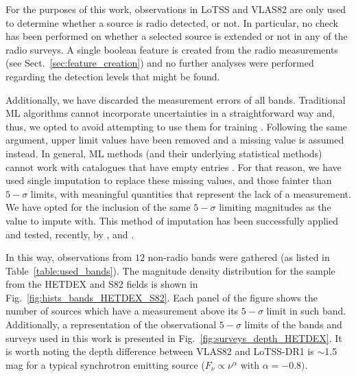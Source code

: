 \documentclass{aa}
\begin{document}
For the purposes of this work, observations in LoTSS and VLAS82 are only used to determine whether a source is radio detected, or not. In particular, no check has been performed on whether a selected source is extended or not in any of the radio surveys. A single boolean feature is created from the radio measurements (see Sect.~\ref{sec:feature_creation}) and no further analyses were performed regarding the detection levels that might be found.

Additionally, we have discarded the measurement errors of all bands. Traditional ML algorithms cannot incorporate uncertainties in a straightforward way and, thus, we opted to avoid attempting to use them for training \citep[for some examples on how they have been incorporated in astrophysically motivated ML studies, see][]{2008ApJ...683...12B, 2019AJ....157...16R, 2022AJ....164....6S}. Following the same argument, upper limit values have been removed and a missing value is assumed instead.%
In general, ML methods (and their underlying statistical methods) cannot work with catalogues that have empty entries \citep{allison2001missing}. For that reason, we have used single imputation \citep[a review on the use of this method in astronomy can be seen in][]{ChattopadhyayData} to replace these missing values, and those fainter than $5{-}\sigma$ limits, with meaningful quantities that represent the lack of a measurement. 
We have opted for the inclusion of the same $5{-}\sigma$ limiting magnitudes as the value to impute with. 
This method of imputation has been successfully applied and tested, recently, by \citet{2021Galax...9...86C, 2022MNRAS.512.2099C}, and \citet{2022MNRAS.514....1C}.

In this way, observations from $12$ non-radio bands were gathered (as listed in Table~\ref{table:used_bands}). 
The magnitude density distribution for the sample from the HETDEX and S82 fields is shown in Fig.~\ref{fig:hists_bands_HETDEX_S82}. Each panel of the figure shows the number of sources which have a measurement above its $5{-}\sigma$ limit in such band. 
Additionally, a representation of the observational $5{-}\sigma$ limits of the bands and surveys used in this work is presented in Fig.~\ref{fig:surveys_depth_HETDEX}. 
It is worth noting the depth difference between VLAS82 and LoTSS-DR1 is $\sim$1.5\,mag for a typical synchrotron emitting source ($F_\nu \propto \nu^{\alpha}$ with $\alpha=-0.8)$.%
\end{document}
